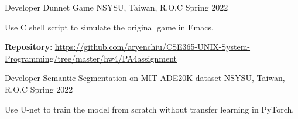
\begin{cventries}

  \cventry
    {Developer} %
    {Dunnet Game} %
    {NSYSU, Taiwan, R.O.C} %
    {Spring 2022} %
    {
      \begin{cvitems} %
        \item {Use C shell script to simulate the original game in Emacs.}
        \item {\textbf{Repository}: \href{https://github.com/aryenchiu/CSE365-UNIX-System-Programming/tree/master/hw4/PA4assignment}{https://github.com/aryenchiu/CSE365-UNIX-System-Programming/tree/master/hw4/PA4assignment}}
      \end{cvitems}
    }

    \cventry
    {Developer} %
    {Semantic Segmentation on MIT ADE20K dataset} %
    {NSYSU, Taiwan, R.O.C} %
    {Spring 2022} %
    {
      \begin{cvitems} %
        \item {Use U-net to train the model from scratch without transfer learning in PyTorch.}
      \end{cvitems}
    }

\end{cventries}
